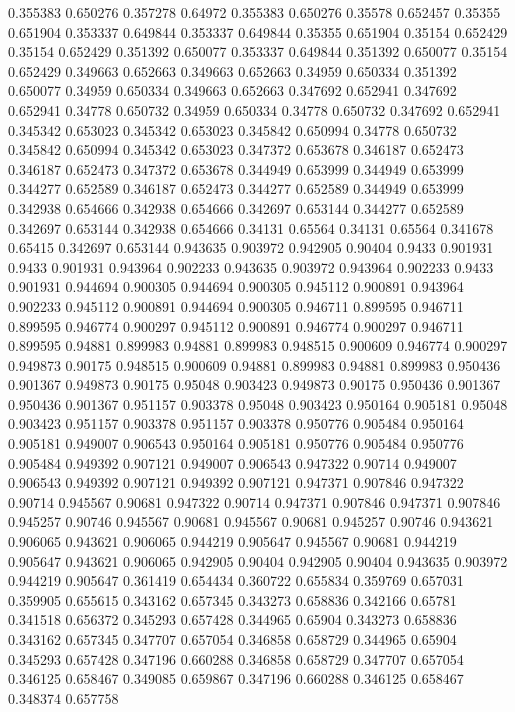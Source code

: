 0.355383 0.650276
0.357278 0.64972
0.355383 0.650276
0.35578 0.652457
0.35355 0.651904
0.353337 0.649844
0.353337 0.649844
0.35355 0.651904
0.35154 0.652429
0.35154 0.652429
0.351392 0.650077
0.353337 0.649844
0.351392 0.650077
0.35154 0.652429
0.349663 0.652663
0.349663 0.652663
0.34959 0.650334
0.351392 0.650077
0.34959 0.650334
0.349663 0.652663
0.347692 0.652941
0.347692 0.652941
0.34778 0.650732
0.34959 0.650334
0.34778 0.650732
0.347692 0.652941
0.345342 0.653023
0.345342 0.653023
0.345842 0.650994
0.34778 0.650732
0.345842 0.650994
0.345342 0.653023
0.347372 0.653678
0.346187 0.652473
0.346187 0.652473
0.347372 0.653678
0.344949 0.653999
0.344949 0.653999
0.344277 0.652589
0.346187 0.652473
0.344277 0.652589
0.344949 0.653999
0.342938 0.654666
0.342938 0.654666
0.342697 0.653144
0.344277 0.652589
0.342697 0.653144
0.342938 0.654666
0.34131 0.65564
0.34131 0.65564
0.341678 0.65415
0.342697 0.653144
0.943635 0.903972
0.942905 0.90404
0.9433 0.901931
0.9433 0.901931
0.943964 0.902233
0.943635 0.903972
0.943964 0.902233
0.9433 0.901931
0.944694 0.900305
0.944694 0.900305
0.945112 0.900891
0.943964 0.902233
0.945112 0.900891
0.944694 0.900305
0.946711 0.899595
0.946711 0.899595
0.946774 0.900297
0.945112 0.900891
0.946774 0.900297
0.946711 0.899595
0.94881 0.899983
0.94881 0.899983
0.948515 0.900609
0.946774 0.900297
0.949873 0.90175
0.948515 0.900609
0.94881 0.899983
0.94881 0.899983
0.950436 0.901367
0.949873 0.90175
0.95048 0.903423
0.949873 0.90175
0.950436 0.901367
0.950436 0.901367
0.951157 0.903378
0.95048 0.903423
0.950164 0.905181
0.95048 0.903423
0.951157 0.903378
0.951157 0.903378
0.950776 0.905484
0.950164 0.905181
0.949007 0.906543
0.950164 0.905181
0.950776 0.905484
0.950776 0.905484
0.949392 0.907121
0.949007 0.906543
0.947322 0.90714
0.949007 0.906543
0.949392 0.907121
0.949392 0.907121
0.947371 0.907846
0.947322 0.90714
0.945567 0.90681
0.947322 0.90714
0.947371 0.907846
0.947371 0.907846
0.945257 0.90746
0.945567 0.90681
0.945567 0.90681
0.945257 0.90746
0.943621 0.906065
0.943621 0.906065
0.944219 0.905647
0.945567 0.90681
0.944219 0.905647
0.943621 0.906065
0.942905 0.90404
0.942905 0.90404
0.943635 0.903972
0.944219 0.905647
0.361419 0.654434
0.360722 0.655834
0.359769 0.657031
0.359905 0.655615
0.343162 0.657345
0.343273 0.658836
0.342166 0.65781
0.341518 0.656372
0.345293 0.657428
0.344965 0.65904
0.343273 0.658836
0.343162 0.657345
0.347707 0.657054
0.346858 0.658729
0.344965 0.65904
0.345293 0.657428
0.347196 0.660288
0.346858 0.658729
0.347707 0.657054
0.346125 0.658467
0.349085 0.659867
0.347196 0.660288
0.346125 0.658467
0.348374 0.657758
